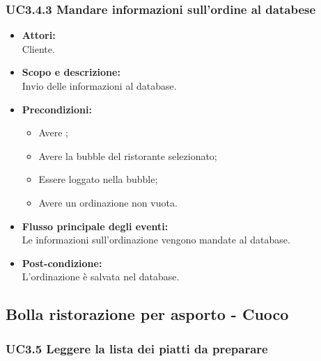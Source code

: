 \subsubsection{UC3.4.3 Mandare informazioni sull’ordine al databese} \label{UC3.4.3}

\begin{itemize}
	\item \textbf{Attori:}
	\\Cliente.
	\item \textbf{Scopo e descrizione:} 
	\\Invio delle informazioni al database.
	\item \textbf{Precondizioni:}
	\begin{itemize}
		\item Avere ;
		\item Avere la bubble del ristorante selezionato;
		\item Essere loggato nella bubble;
		\item Avere un ordinazione non vuota.
	\end{itemize}
	\item \textbf{Flusso principale degli eventi:}
	\\Le informazioni sull’ordinazione vengono mandate al database.
	\item \textbf{Post-condizione:}
	\\L’ordinazione è salvata nel database.
\end{itemize}

\subsection{Bolla ristorazione per asporto - Cuoco}

\subsubsection{UC3.5 Leggere la lista dei piatti da preparare} \label{UC3.5}

